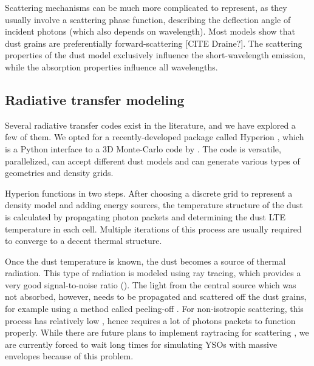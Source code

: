 Scattering mechanisms can be much more complicated to represent, as they usually involve a scattering phase function, describing the deflection angle of incident photons (which also depends on wavelength). Most models show that dust grains are preferentially forward-scattering [CITE Draine?]. The scattering properties of the dust model exclusively influence the short-wavelength emission, while the absorption properties influence all wavelengths. 

%
%

\subsection{Radiative transfer modeling}
\label{subsubsec:radiative}

Several radiative transfer codes exist in the literature, and we have explored a few of them. We opted for a recently-developed package called Hyperion \citep{Robitaille:2011fc}, which is a Python interface to a 3D Monte-Carlo code by \citet{Whitney:2013cw}. The code is versatile, parallelized, can accept different dust models and can generate various types of geometries and density grids.

Hyperion functions in two steps. After choosing a discrete grid to represent a density model and adding energy sources, the temperature structure of the dust is calculated by propagating photon packets and determining the dust LTE temperature in each cell. Multiple iterations of this process are usually required to converge to a decent thermal structure.

Once the dust temperature is known, the dust becomes a source of thermal radiation. This type of radiation is modeled using ray tracing, which provides a very good signal-to-noise ratio (\SNR). The light from the central source which was not absorbed, however, needs to be propagated and scattered off the dust grains, for example using a method called peeling-off \citep{YusefZadeh:1984ff}. For non-isotropic scattering, this process has relatively low \SNR, hence requires a lot of photons packets to function properly. While there are future plans to implement raytracing for scattering \citep{Robitaille:2011fc}, we are currently forced to wait long times for simulating YSOs with massive envelopes because of this problem.

